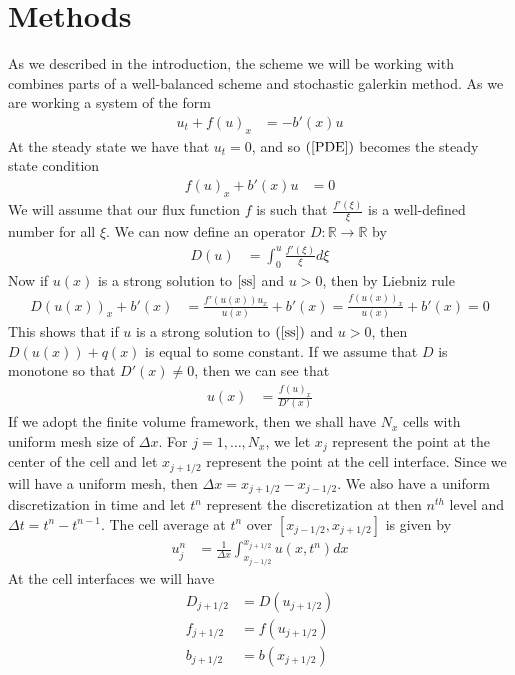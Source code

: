 \documentclass[12pt]{article}
\begin{document}
\section{Methods}
As we described in the introduction, the scheme we will be working with combines parts of a well-balanced scheme and stochastic galerkin method. As we are working a system of the form
\begin{align}
    u_t + f(u)_x &= -b'(x)u \label{PDE}
\end{align}
At the steady state we have that $u_t = 0$, and so $(\ref{PDE})$ becomes the steady state condition
\begin{align}
    f(u)_x +b'(x)u &= 0 \label{ss}
\end{align}
We will assume that our flux function $f$ is such that $\frac{f'(\xi)}{\xi}$ is a well-defined number for all $\xi$. We can now define an operator $D:\mathbb{R}\to\mathbb{R}$ by
\begin{align*}
    D(u) &= \int_0^{u}\frac{f'(\xi)}{\xi}d\xi
\end{align*}
Now if $u(x)$ is a strong solution to $\ref{ss}$ and $u > 0$, then by Liebniz rule
\begin{align*}
    D(u(x))_x + b'(x) &= \frac{f'(u(x))u_x}{u(x)} + b'(x) = \frac{f(u(x))_x}{u(x)} + b'(x) = 0
\end{align*}
This shows that if $u$ is a strong solution to $(\ref{ss})$ and $u > 0$, then $D(u(x)) + q(x)$ is equal to some constant. If we assume that $D$ is monotone so that $D'(x)\not=0$, then we can see that
\begin{align*}
    u(x) &= \frac{f(u)_x}{D'(x)}
\end{align*}
If we adopt the finite volume framework, then we shall have $N_x$ cells with uniform mesh size of $\Delta x$. For $j = 1, \ldots, N_x$, we let $x_j$ represent the point at the center of the cell and let $x_{j+1/2}$ represent the point at the cell interface. Since we will have a uniform mesh, then $\Delta x = x_{j+1/2}-x_{j-1/2}$. We also have a uniform discretization in time and let $t^n$ represent the discretization at then $n^{th}$ level and $\Delta t =t^{n}-t^{n-1}$. The cell average at $t^n$ over $[x_{j-1/2},x_{j+1/2}]$ is given by
\begin{align*}
    u_j^n &= \frac{1}{\Delta x}\int_{x_{j-1/2}}^{x_{j+1/2}} u(x,t^n)dx
\end{align*}
At the cell interfaces we will have
\begin{align*}
    D_{j+1/2} &= D(u_{j+1/2})\\
    f_{j+1/2} &= f(u_{j+1/2})\\
    b_{j+1/2} &= b(x_{j+1/2})
\end{align*}
\end{document}
